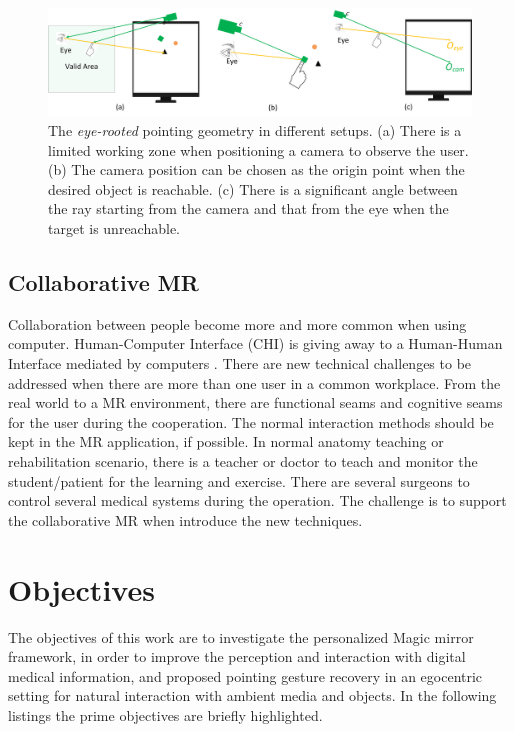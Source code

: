 \begin{figure} [htb]
	\centering
	\includegraphics[width= \linewidth]{figures/4-PAST/problem}
	\caption{The \textit{eye-rooted} pointing geometry in different setups. (a) There is a limited working zone when positioning a camera to observe the user. (b) The camera position can be chosen as the origin point when the desired object is reachable. (c) There is a significant angle between the ray starting from the camera and that from the eye when the target is unreachable.}
	\label{fig:1-intro:problem}
\end{figure}

\subsection{Collaborative MR}
Collaboration between people become more and more common when using computer. Human-Computer Interface (CHI) is giving away to a Human-Human Interface mediated by computers \cite{Billinghurst1999}. There are new technical challenges to be addressed when there are more than one user in a common workplace. From the real world to a MR environment, there are functional seams and cognitive seams for the user during the cooperation. The normal interaction methods should be kept in the MR application, if possible.
In normal anatomy teaching or rehabilitation scenario, there is a teacher or doctor to teach and monitor the student/patient for the learning and exercise. There are several surgeons to control several medical systems during the operation. The challenge is to support the collaborative MR when introduce the new techniques.

\section{Objectives}
The objectives of this work are to investigate the personalized Magic mirror framework, in order to improve the perception and interaction with digital medical information, and proposed pointing gesture recovery in an egocentric setting for natural interaction with ambient media and objects.
In the following listings the prime objectives are briefly highlighted.

